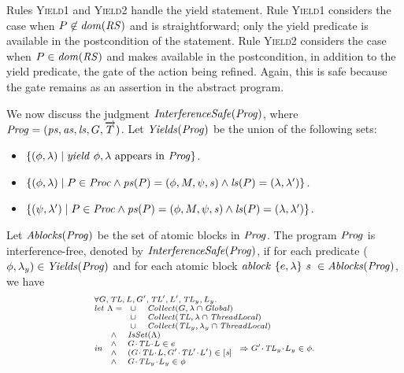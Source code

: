 Rules \textsc{Yield1} and \textsc{Yield2} handle the yield statement.
Rule \textsc{Yield1} considers the case when $P \not \in \mathit{dom}(\mathit{RS})$ and is straightforward;
only the yield predicate is available in the postcondition of the statement.
Rule \textsc{Yield2} considers the case when $P \in \mathit{dom}(\mathit{RS})$ and makes available in the postcondition, in 
addition to the yield predicate, the gate of the action being refined.
Again, this is safe because the gate remains as an assertion in the abstract program.

We now discuss the judgment $\mathit{InterferenceSafe}(\mathit{Prog})$,
where $\mathit{Prog} = (\mathit{ps}, \mathit{as}, \mathit{ls}, G, \overrightarrow{T})$. 
Let $\mathit{Yields}(\mathit{Prog})$ be the union of the following sets:
\begin{itemize}
\item
$\{(\phi,\lambda) \mid \mathit{yield}\ \phi,\lambda~\mathrm{appears~in~\mathit{Prog}}\}$.
\item
$\{(\phi,\lambda) \mid P \in \mathit{Proc} \wedge \mathit{ps}(P) = (\phi, M, \psi, \mathit{s}) \wedge \mathit{ls}(P) = (\lambda,\lambda')\}$.
\item
$\{(\psi,\lambda') \mid P \in \mathit{Proc} \wedge \mathit{ps}(P) = (\phi, M, \psi, \mathit{s}) \wedge \mathit{ls}(P) = (\lambda,\lambda')\}$.
\end{itemize}
Let $\mathit{Ablocks}(\mathit{Prog})$ be the set of atomic blocks in $\mathit{Prog}$.
The program $\mathit{Prog}$ is interference-free, denoted by $\mathit{InterferenceSafe}(\mathit{Prog})$,
if for each predicate ($\phi,\lambda_y) \in \mathit{Yields}(\mathit{Prog})$ and 
for each atomic block $\mathit{ablock}\ {\{e,\lambda\}}\ {\mathit{s}}\  \in \mathit{Ablocks}(\mathit{Prog})$, we have
\[
\scriptsize{
\begin{array}{l}
\forall \varsG,\varsTL,\varsL,\varsG',\varsTL',\varsL',\varsTL_y,\varsL_y.\\ 
\mathit{let}\ \Lambda =
\begin{array}[t]{ll}
\cup & \Collect(\varsG, \lins \cap \Global) \\
\cup & \Collect(\varsTL, \lins \cap \ThreadLocal) \\
\cup & \Collect(\varsTL_y, \lins_y \cap \ThreadLocal) 
\end{array} \\
\mathit{in}\
\begin{array}{ll}
\wedge & \IsSet(\Lambda) \\
\wedge & \MakeStore{\varsG}{\varsTL}{\varsL} \in e \\
\wedge & (\MakeStore{\varsG}{\varsTL}{\varsL}, \MakeStore{\varsG'}{\varsTL'}{\varsL'}) \in \trel{\stmt} \\
\wedge & \MakeStore{\varsG}{\varsTL_y}{\varsL_y} \in \phi
\end{array}
\Rightarrow \MakeStore{\varsG'}{\varsTL_y}{\varsL_y} \in \phi.
\end{array}
}
\]

